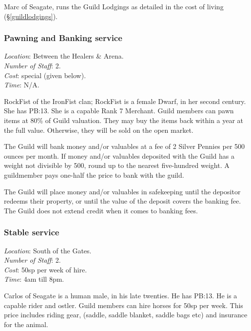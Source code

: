 \documentclass[twoside,a4paper]{article}
\begin{document}
\begin{multicols}{2}
Marc of Seagate, runs the Guild Lodgings as detailed in the cost of
living (\S\ref{guildlodgings}).

\subsubsection{Pawning and Banking service}

\begin{flushleft}
\emph{Location}: Between the Healers \& Arena. \\
\emph{Number of Staff}: 2. \\
\emph{Cost}: special (given below). \\
\emph{Time}: N/A. \\
\end{flushleft}

RockFist of the IronFist clan; RockFist is a female Dwarf, in her
second century. She has PB:13.  She is a capable Rank 7 Merchant.
Guild members can pawn items at 80\% of Guild valuation. They may buy
the items back within a year at the full value. Otherwise, they will
be sold on the open market.

The Guild will bank money and/or valuables at a fee of 2 Silver
Pennies per 500 ounces per month.  If money and/or valuables deposited
with the Guild has a weight not divisible by 500, round up to the
nearest five-hundred weight.  A guildmember pays one-half the price to
bank with the guild.

The Guild will place money and/or valuables in safekeeping until the
depositor redeems their property, or until the value of the deposit
covers the banking fee.  The Guild does not extend credit when it
comes to banking fees.

\subsubsection{Stable service}

\begin{flushleft}
\emph{Location}: South of the Gates. \\
\emph{Number of Staff}: 2. \\
\emph{Cost}: 50sp per week of hire. \\
\emph{Time}: 4am till 8pm. \\
\end{flushleft}

Carlos of Seagate is a human male, in his late twenties. He has
PB:13. He is a capable rider and ostler. Guild members can hire horses
for 50sp per week. This price includes riding gear, (saddle, saddle
blanket, saddle bags etc) and insurance for the animal.


\end{multicols}
\end{document}
